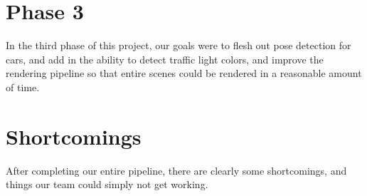 \section{Phase 3}
In the third phase of this project, our goals were to flesh out pose detection for cars, and add in the ability to detect traffic light colors, and improve the rendering pipeline so that entire scenes could be rendered in a reasonable amount of time.




\section{Shortcomings}
After completing our entire pipeline, there are clearly some shortcomings, and things our team could simply not get working.